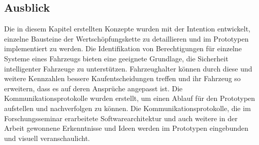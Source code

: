 \subsection{Ausblick}
Die in diesem Kapitel erstellten Konzepte wurden mit der Intention entwickelt, einzelne Bausteine der Wertschöpfungskette zu detaillieren und im Prototypen implementiert zu werden. Die Identifikation von Berechtigungen für einzelne Systeme eines Fahrzeugs bieten eine geeignete Grundlage, die Sicherheit intelligenter Fahrzeuge zu unterstützen. Fahrzeughalter können durch diese und weitere Kennzahlen bessere Kaufentscheidungen treffen und ihr Fahrzeug so erweitern, dass es auf deren Ansprüche angepasst ist. Die Kommunikationsprotokolle wurden erstellt, um einen Ablauf für den Prototypen aufstellen und nachverfolgen zu können. Die Kommunikationsprotokolle, die im Forschungsseminar erarbeitete Softwarearchitektur und auch weitere in der Arbeit gewonnene Erkenntnisse und Ideen werden im Prototypen eingebunden und visuell veranschaulicht.\\\\\\\\\\\\\\\\\\\\\\